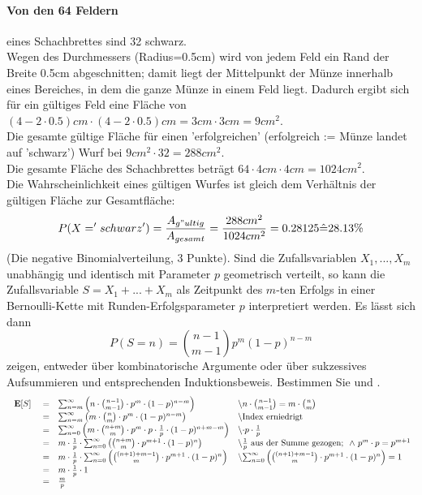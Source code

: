 \documentclass[twoside]{article}
\begin{document}
		\paragraph{Von den 64 Feldern} eines Schachbrettes sind 32 schwarz.\\
		Wegen des Durchmessers (Radius=0.5cm) wird von jedem Feld ein Rand der Breite 0.5cm abgeschnitten; damit liegt der Mittelpunkt der Münze innerhalb eines Bereiches, in dem die ganze Münze in einem Feld liegt.
		Dadurch ergibt sich für ein gültiges Feld eine Fläche von $(4-2\cdot0.5)cm\cdot(4-2\cdot0.5)cm=3cm\cdot3cm=9cm^2$.\\
		Die gesamte gültige Fläche für einen 'erfolgreichen' (erfolgreich := Münze landet auf 'schwarz') Wurf bei $9cm^2\cdot32=288cm^2$.\\
		Die gesamte Fläche des Schachbrettes beträgt $64\cdot4cm\cdot4cm=1024cm^2$.\\
		Die Wahrscheinlichkeit eines gültigen Wurfes ist gleich dem Verhältnis der gültigen Fläche zur Gesamtfläche:
		\[
			P(X='schwarz')=\frac{A_{g"ultig}}{A_{gesamt}}=\frac{288cm^2}{1024cm^2}=0.28125\hat{=}28.13\%
		\]
		(Die negative Binomialverteilung, 3 Punkte).
		Sind die Zufallsvariablen $X_1,...,X_m$ unabhängig und identisch mit Parameter $p$ geometrisch verteilt, so kann die Zufallsvariable  $S=X_1+...+X_m$ als Zeitpunkt des $m$-ten Erfolgs in einer Bernoulli-Kette mit Runden-Erfolgsparameter $p$ interpretiert werden.
		Es lässt sich dann
		\[
			P(S=n)=\binom{n-1}{m-1}p^m(1-p)^{n-m}
		\]
		zeigen, entweder über kombinatorische Argumente oder über sukzessives Aufsummieren und entsprechenden Induktionsbeweis.
		Bestimmen Sie  und .
		\begin{equation*}
		    \begin{array}{rlll}
		        $\e{S}$&=&\sum_{n=m}^{\infty}\left(n\cdot\binom{n-1}{m-1}\cdot p^m\cdot (1-p)^{n-m}\right)&$\textbackslash $n\cdot\binom{n-1}{m-1}=m\cdot\binom{n}{m}\\
		        &=&\sum_{n=m}^{\infty}\left(m\cdot\binom{n}{m}\cdot p^m\cdot (1-p)^{n-m}\right)&$\textbackslash Index erniedrigt$\\
		        &=&\sum_{n=0}^{\infty}\left(m\cdot\binom{n+m}{m}\cdot p^m\cdot p\cdot\frac{1}{p}\cdot (1-p)^{n+m-m}\right)&$\textbackslash $\cdot p \cdot\frac{1}{p}\\
		        &=&m\cdot\frac{1}{p}\cdot\sum_{n=0}^{\infty}\left(\binom{n+m}{m}\cdot p^{m+1}\cdot (1-p)^{n}\right)&$\textbackslash $\frac{1}{p}$ aus der Summe gezogen; $~\land~p^m\cdot p =p^{m+1}\\
		        &=&m\cdot\frac{1}{p}\cdot\sum_{n=0}^{\infty}\left(\binom{(n+1)+m-1}{m}\cdot p^{m+1}\cdot (1-p)^{n}\right)&$\textbackslash $\sum_{n=0}^{\infty}\left(\binom{(n+1)+m-1}{m}\cdot p^{m+1}\cdot (1-p)^{n}\right) = 1\\
		        &=&m\cdot \frac{1}{p}\cdot 1\\
		        &=&\frac{m}{p}
		    \end{array}
		\end{equation*}
\end{document}
